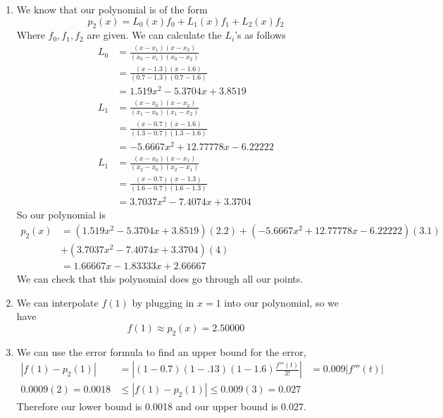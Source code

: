 \documentclass[openany]{report}
\begin{document}
\begin{enumerate}[label=(\roman*)]
    \item We know that our polynomial is of the form
    \[p_2(x) = L_0(x) f_0 + L_1(x)f_1 + L_2(x)f_2\]
    Where $f_0,f_1,f_2$ are given. We can calculate the $L_i$'s as follows
    \begin{align*}
        L_0 &= \frac{(x - x_1)(x-x_2)}{(x_0 - x_1)(x_0-x_2)}\\
        &= \frac{(x-1.3)(x-1.6)}{(0.7 - 1.3)(0.7-1.6)}\\
        &= 1.519x^2 - 5.3704x + 3.8519\\
        L_1 &= \frac{(x - x_0)(x-x_2)}{(x_1 - x_0)(x_1-x_2)}\\
        &= \frac{(x-0.7)(x-1.6)}{(1.3-0.7)(1.3-1.6)}\\
        &= -5.6667x^2 + 12.77778x - 6.22222\\
        L_1 &= \frac{(x - x_0)(x-x_1)}{(x_2 - x_0)(x_2-x_1)}\\
        &= \frac{(x-0.7)(x-1.3)}{(1.6-0.7)(1.6-1.3)}\\
        &= 3.7037x^2 - 7.4074x + 3.3704
    \end{align*}
    So our polynomial is
    \begin{align*}
        p_2(x) &= (1.519x^2 - 5.3704x + 3.8519)(2.2) + (-5.6667x^2 + 12.77778x - 6.22222)(3.1) \\
        &+ (3.7037x^2 - 7.4074x + 3.3704)(4)\\
        &= 1.66667x - 1.83333x + 2.66667
    \end{align*}
    We can check that this polynomial does go through all our points.
    \item We can interpolate $f(1)$ by plugging in $x = 1$ into our polynomial, so we have
    \[f(1) \approx p_2(x) = 2.50000\]
    \item We can use the error formula to find an upper bound for the error,
    \begin{align*}
        |f(1) - p_2(1)| &= \left|(1 - 0.7)(1-.13)(1-1.6)\frac{f'''(t)}{3!}\right|
        &= 0.009 |f'''(t)|\\
        0.0009(2) = 0.0018 &\leq |f(1) - p_2(1)| \leq 0.009(3) = 0.027
    \end{align*}
    Therefore our lower bound is 0.0018 and our upper bound is 0.027.
\end{enumerate}
\end{document}
